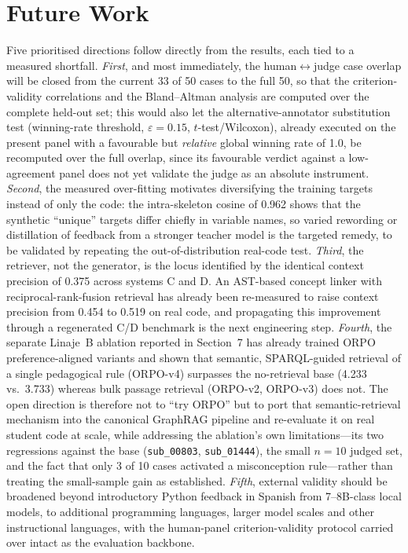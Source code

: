 \documentclass[sageh]{sagej}
\begin{document}
\section{Future Work}
Five prioritised directions follow directly from the results, each tied to a measured shortfall. \emph{First}, and most immediately, the human$\leftrightarrow$judge case overlap will be closed from the current 33 of 50 cases to the full 50, so that the criterion-validity correlations and the Bland--Altman analysis are computed over the complete held-out set; this would also let the alternative-annotator substitution test (winning-rate threshold, $\varepsilon=0.15$, $t$-test/Wilcoxon), already executed on the present panel with a favourable but \emph{relative} global winning rate of 1.0, be recomputed over the full overlap, since its favourable verdict against a low-agreement panel does not yet validate the judge as an absolute instrument.\cite{calderon2025alttest} \emph{Second}, the measured over-fitting motivates diversifying the training targets instead of only the code: the intra-skeleton cosine of 0.962 shows that the synthetic ``unique'' targets differ chiefly in variable names, so varied rewording or distillation of feedback from a stronger teacher model is the targeted remedy, to be validated by repeating the out-of-distribution real-code test. \emph{Third}, the retriever, not the generator, is the locus identified by the identical context precision of 0.375 across systems C and D. An AST-based concept linker with reciprocal-rank-fusion retrieval has already been re-measured to raise context precision from 0.454 to 0.519 on real code, and propagating this improvement through a regenerated C/D benchmark is the next engineering step. \emph{Fourth}, the separate Linaje~B ablation reported in Section~7 has already trained ORPO preference-aligned variants and shown that semantic, SPARQL-guided retrieval of a single pedagogical rule (ORPO-v4) surpasses the no-retrieval base (4.233 vs.\ 3.733) whereas bulk passage retrieval (ORPO-v2, ORPO-v3) does not. The open direction is therefore not to ``try ORPO'' but to port that semantic-retrieval mechanism into the canonical GraphRAG pipeline and re-evaluate it on real student code at scale, while addressing the ablation's own limitations---its two regressions against the base (\texttt{sub\_00803}, \texttt{sub\_01444}), the small $n=10$ judged set, and the fact that only 3 of 10 cases activated a misconception rule---rather than treating the small-sample gain as established. \emph{Fifth}, external validity should be broadened beyond introductory Python feedback in Spanish from 7--8B-class local models, to additional programming languages, larger model scales and other instructional languages, with the human-panel criterion-validity protocol carried over intact as the evaluation backbone.
\end{document}
